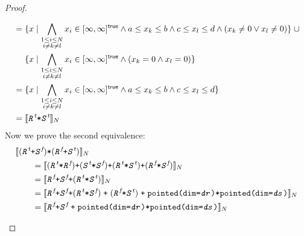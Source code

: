 \documentclass{article}
\theoremstyle{definition}
\theoremstyle{plain}
\theoremstyle{remark}
\newcommand{\interp}[1]{\llbracket {#1} \rrbracket}
\newcommand{\interv}[3]{\textnormal{$\lbrack#1,#2\rbrack^{#3}$}}
\newcommand{\textcap}[1]{\texttt{\textit{#1}}}
\begin{document}
\begin{proof}
\begin{description}
\begin{align*}
        & = \{ x \mid
            \bigwedge_{\substack{1 \leq i \leq N \\ i \neq k \neq l}} x_i \in
              \interv{\infty}{\infty}{\textsf{true}}
            \wedge a \leq x_k \leq b
          \wedge c \leq x_l \leq d \wedge {(x_k \neq 0 \vee x_l \neq 0)} \}
          \;\cup \\
        & \quad\,\, \{ x \mid
            \bigwedge_{\substack{1 \leq i \leq N \\ i \neq k \neq l}} x_i \in
              \interv{\infty}{\infty}{\textsf{true}}
            \wedge (x_k = 0 \wedge x_l = 0) \} \\
        & = \{ x \mid
            \bigwedge_{\substack{1 \leq i \leq N \\ i \neq k \neq l}} x_i \in
              \interv{\infty}{\infty}{\textsf{true}}
            \wedge a \leq x_k \leq b
            \wedge c \leq x_l \leq d \} \\
        & = \interp{\textcap{R}^{\textit{t}} \texttt{*} \textcap{S}^{\textit{t}}}_N
      \end{align*}
%
      Now we prove the second equivalence:
      \begin{align*}
        \hspace{2em}&\hspace{-2em} \interp{
            (\textcap{R}^{\textit{t}} \texttt{+} \textcap{S}^{\textit{f}})
            \texttt{*}
            (\textcap{R}^{\textit{f}} \texttt{+} \textcap{S}^{\textit{t}})
          }_N \\
        &= \interp{
             (\textcap{R}^{\textit{t}} \texttt{*} \textcap{R}^{\textit{f}})
             \texttt{+}
             (\textcap{S}^{\textit{t}} \texttt{*} \textcap{S}^{\textit{f}})
             \texttt{+}
             (\textcap{R}^{\textit{t}} \texttt{*} \textcap{S}^{\textit{t}})
             \texttt{+}
             (\textcap{R}^{\textit{f}} \texttt{*} \textcap{S}^{\textit{f}})
           }_N \\
        &= \interp{
             \textcap{R}^{\textit{f}}
             \texttt{+}
             \textcap{S}^{\textit{f}}
             \texttt{+}
             (\textcap{R}^{\textit{t}} \texttt{*} \textcap{S}^{\textit{t}})
           }_N \\
        &= \interp
             {\textcap{R}^{\textit{f}}
              \texttt{+}
              \textcap{S}^{\textit{f}}
              \texttt{+}
              {(\textcap{R}^{\textit{t}} \texttt{*} \textcap{S}^{\textit{f}})}
               \;\texttt{+}\;
               {(\textcap{R}^{\textit{f}} \texttt{*} \textcap{S}^{\textit{t}})}
               \;\texttt{+}\;
               \texttt{pointed(dim=\textcap{dr})*pointed(dim=\textcap{ds})}}_N \\
        &= \interp{\textcap{R}^{\textit{f}} \texttt{+} \textcap{S}^{\textit{f}}
                   \;\texttt{+}\;
                   \texttt{pointed(dim=\textcap{dr})*pointed(dim=\textcap{ds})}}_N
      \end{align*}
  \end{description}
\end{proof}
\end{document}
